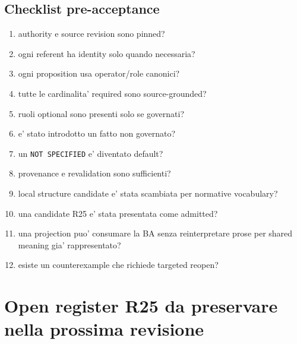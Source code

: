 \documentclass[11pt,a4paper]{article}
\begin{document}
\subsection{Checklist pre-acceptance}
\begin{enumerate}
  \item authority e source revision sono pinned?
  \item ogni referent ha identity solo quando necessaria?
  \item ogni proposition usa operator/role canonici?
  \item tutte le cardinalita' required sono source-grounded?
  \item ruoli optional sono presenti solo se governati?
  \item e' stato introdotto un fatto non governato?
  \item un \texttt{NOT SPECIFIED} e' diventato default?
  \item provenance e revalidation sono sufficienti?
  \item local structure candidate e' stata scambiata per normative vocabulary?
  \item una candidate R25 e' stata presentata come admitted?
  \item una projection puo' consumare la BA senza reinterpretare prose per shared meaning gia' rappresentato?
  \item esiste un counterexample che richiede targeted reopen?
\end{enumerate}

\section{Open register R25 da preservare nella prossima revisione}
\opentag
\end{document}
